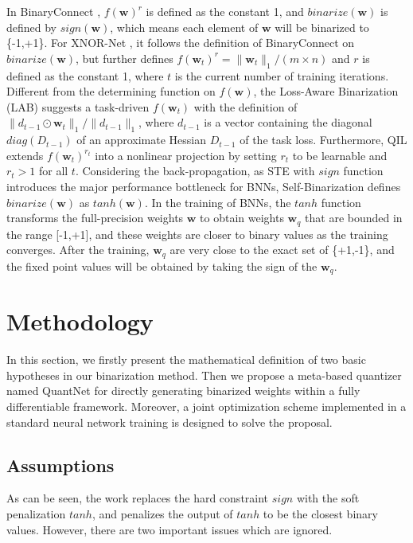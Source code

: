 \documentclass[runningheads]{llncs}
\begin{document}
In BinaryConnect \cite{courbariaux2015binaryconnect},
$f(\textbf{w})^r$ is defined as the constant 1,
and $binarize(\textbf{w})$ is defined by $sign(\textbf{w})$,
which means each element of $\textbf{w}$ will be binarized to \{-1,+1\}.
For XNOR-Net \cite{rastegari2016xnor},
it follows the definition of BinaryConnect on $binarize(\textbf{w})$,
but further defines $f(\textbf{w}_t)^r = \|\textbf{w}_t\|_1 / (m \times n)$
and $r$ is defined as the constant 1,
where $t$ is the current number of training iterations.
Different from the determining function on $f(\textbf{w})$,
the Loss-Aware Binarization (LAB) \cite{hou2016loss} suggests
a task-driven $f(\textbf{w}_t)$ with the definition of
$\|d_{t-1} \odot \textbf{w}_t\|_1 / \|d_{t-1}\|_1$,
where $d_{t-1}$ is a vector containing the diagonal $diag(D_{t-1})$ of
an approximate Hessian $D_{t-1}$ of the task loss.
Furthermore, QIL \cite{jung2019learning} extends $f(\textbf{w}_t)^{r_t}$
into a nonlinear projection by setting $r_t$ to be learnable and $r_t > 1$ for all $t$.
Considering the back-propagation,
as STE \cite{yin2019understanding} with $sign$ function
introduces the major performance bottleneck for BNNs,
Self-Binarization \cite{lahoud2019self} defines $binarize(\textbf{w})$ as $tanh(\textbf{w})$.
In the training of BNNs,
the $tanh$ function transforms the full-precision weights $\textbf{w}$
to obtain weights $\textbf{w}_q$ that are bounded in the range [-1,+1],
and these weights are closer to binary values as the training converges.
After the training, $\textbf{w}_q$ are very close to the exact set of \{+1,-1\},
and the fixed point values will be obtained by taking the sign of the $\textbf{w}_q$.

\section{Methodology}
In this section,
we firstly present the mathematical definition of two basic hypotheses in our binarization method.
Then we propose a meta-based quantizer named QuantNet for directly generating
binarized weights within a fully differentiable framework.
Moreover, a joint optimization scheme implemented in a standard neural network training is designed to solve the proposal.

\subsection{Assumptions}
As can be seen,
the work \cite{lahoud2019self} replaces the hard constraint $sign$ with the soft penalization $tanh$,
and penalizes the output of $tanh$ to be the closest binary values.
However, there are two important issues which are ignored.
\end{document}
